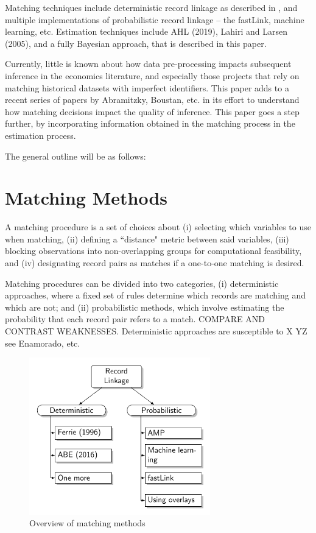 \documentclass[12pt]{article}
\begin{document}
Matching techniques include deterministic record linkage as described in \cite{}, and multiple implementations of probabilistic record linkage -- the fastLink, machine learning, etc. Estimation techniques include AHL (2019), Lahiri and Larsen (2005), and a fully Bayesian approach, that is described in this paper. 

Currently, little is known about how data pre-processing impacts subsequent inference in the economics literature, and especially those projects that rely on matching historical datasets with imperfect identifiers.  This paper adds to a recent series of papers by Abramitzky, Boustan, etc.  in its effort to understand how matching decisions impact the quality of inference.   This paper goes a step further, by incorporating information obtained in the matching process in the estimation process.  

The general outline will be as follows:


\section{Matching Methods}

A matching procedure is a set of choices about (i) selecting which variables to use when matching, (ii) defining a ``distance" metric between said variables, (iii) blocking observations into non-overlapping groups for computational feasibility, and (iv) designating record pairs as matches if a one-to-one matching is desired.    

Matching procedures can be divided into two categories, (i) deterministic approaches, where a fixed set of rules determine which records are matching and which are not; and (ii) probabilistic methods, which involve estimating the probability that each record pair refers to a match.  COMPARE AND CONTRAST WEAKNESSES.  Deterministic approaches are susceptible to X YZ  see Enamorado, etc. 

\begin{figure}[h!]
\centering
\caption{Overview of matching methods}
\includegraphics[width=0.7\textwidth]{./RecordLinkageGraphics.pdf}
\end{figure}
\end{document}
